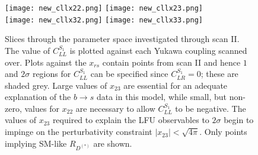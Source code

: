 \begin{figure}
    \texttt{[image: new\_cllx22.png]} \hfill
    \texttt{[image: new\_cllx23.png]} \\
    \texttt{[image: new\_cllx32.png]} \hfill
    \texttt{[image: new\_cllx33.png]}
    \caption[Slices through the parameter space investigated through scan
    II.]{Slices through the parameter space investigated through scan II. The
      value of $C_{LL}^{S_{1}}$ is plotted against each Yukawa coupling scanned
      over. Plots against the $x_{rs}$ contain points from scan II and hence $1$
      and $2\sigma$ regions for $C^{S_{1}}_{LL}$ can be specified since
      $C^{S_{1}}_{LR} = 0$; these are shaded grey. Large values of $x_{23}$ are
      essential for an adequate explanation of the $b \to s$ data in this model,
      while small, but non-zero, values for $x_{22}$ are necessary to allow
      $C_{LL}^{S_{1}}$ to be negative. The values of $x_{23}$ required to
      explain the LFU observables to $2\sigma$ begin to impinge on the
      perturbativity constraint $|x_{23}| < \sqrt{4\pi}$. Only points implying
      SM-like $R_{D^{(*)}}$ are shown.}
  \label{fig:ch3-rkscans}
\end{figure}

